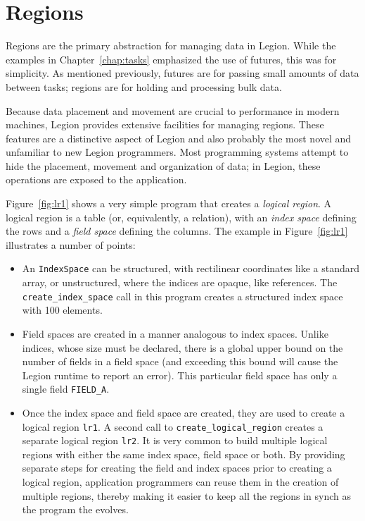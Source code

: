 \chapter{Regions}
\label{chap:regions}

Regions are the primary abstraction for managing data in Legion.  While the
examples in Chapter~\ref{chap:tasks} emphasized the use of futures, this was for
simplicity.  As mentioned previously, futures are for passing small amounts of data
between tasks; regions are for holding and processing bulk data.

Because data placement and movement are crucial to performance in modern machines,
Legion provides extensive facilities for managing regions.  These features are a
distinctive aspect of Legion and also probably the most novel and unfamiliar 
to new Legion programmers.  Most programming systems attempt to hide the placement,
movement and organization of data; in Legion, these operations are exposed to
the application.

Figure~\ref{fig:lr1} shows a very simple program that
creates a {\em logical region}.  A logical region is a table (or,
equivalently, a relation), with an {\em index space} defining the rows
and a {\em field space} defining the columns. The example
in Figure~\ref{fig:lr1} illustrates a number of points:

\begin{itemize}

\item An {\tt IndexSpace} can be structured, with rectilinear coordinates like a standard
array, or unstructured, where the indices are opaque, like references.  The {\tt create\_index\_space}
call in this program creates a structured index space with 100 elements.

\item Field spaces are created in a manner analogous to index spaces.
  Unlike indices, whose size must be declared, there is a global upper
  bound on the number of fields in a field space (and exceeding this bound will cause
  the Legion runtime to report an error).  This particular
  field space has only a single field {\tt FIELD\_A}.

\item Once the index space and field space are created, they are used to create
a logical region {\tt lr1}.  A second call to {\tt create\_logical\_region}
creates a separate logical region {\tt lr2}.  It is very common to build
multiple logical regions with either the same index space, field space or both.
By providing separate steps for creating the field and index spaces prior to creating
a logical region, application programmers can reuse them in the creation of multiple
regions, thereby making it easier to keep all the regions in synch as the program the
evolves.
\end{itemize}


